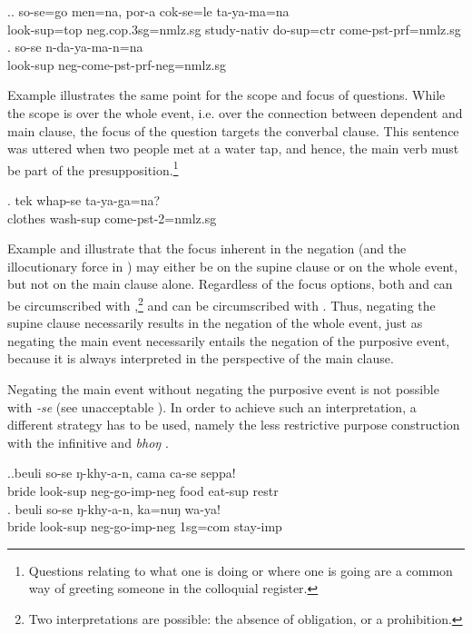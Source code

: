 \ex.\ag. so-se=go   men=na,     por-a         cok-se=le ta-ya-ma=na\\
look{\sc -sup=top} {\sc neg.cop.3sg=nmlz.sg} study{\sc -nativ} do{\sc -sup=ctr} come{\sc [3sg]-pst-prf=nmlz.sg}\\
\bg. so-se n-da-ya-ma-n=na\\
look{\sc -sup} {\sc neg-}come{\sc [3sg]-pst-prf-neg=nmlz.sg}\\


Example \Next illustrates the same point for the scope and focus of questions. While the scope is over the whole event, i.e. over the connection between dependent and main clause, the focus of the question targets the converbal clause. This sentence was uttered when two people met at a water tap, and hence, the main verb  must be part of the presupposition.\footnote{Questions relating to what one is doing or where one is going are a common way of greeting someone in the colloquial register.}

\exg. tek whap-se ta-ya-ga=na?\\
		clothes   wash{\sc -sup} come{\sc -pst-2=nmlz.sg}\\

Example \Next  and \NNext illustrate that the focus inherent in the negation (and the illocutionary force in \Next) may either be on the supine clause or on the whole event, but not on the main clause alone. Regardless of the focus options, both \Next[a] and \Next[b] can be circumscribed with ,\footnote{Two interpretations are possible: the absence of obligation, or a prohibition.} and \LLast[a] can be circumscribed with . Thus, negating the supine clause necessarily results in the negation of the whole event, just as negating the main event necessarily entails the negation of the purposive event, because it is always interpreted in the perspective of the main clause. 

Negating the main event without negating the purposive event is not possible with \emph{-se} (see unacceptable \NNext[a]).  In order to achieve such an interpretation, a different strategy has to be used, namely the less restrictive purpose construction with the infinitive and \emph{bhoŋ} \NNext[b].  

\ex.\ag.beuli so-se ŋ-khy-a-n, cama ca-se seppa!\\
bride   look{\sc -sup}   {\sc neg-}go{\sc -imp-neg} food   eat{\sc -sup} {\sc restr}\\
\bg. beuli so-se ŋ-khy-a-n, ka=nuŋ wa-ya!\\
bride   look{\sc -sup} {\sc neg-}go{\sc -imp-neg} {\sc 1sg=com} stay{\sc -imp}\\

